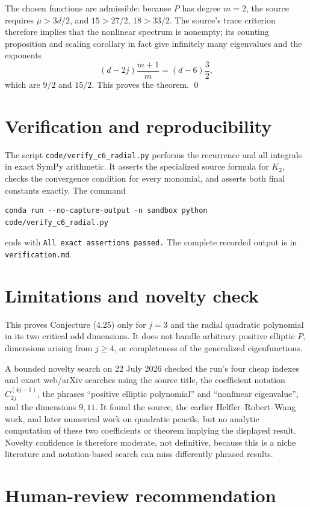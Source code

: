 \documentclass[11pt]{article}
\begin{document}
The chosen functions are admissible: because $P$ has degree $m=2$, the source
requires $\mu>3d/2$, and $15>27/2$, $18>33/2$.  The source's trace criterion
therefore implies that the nonlinear spectrum is nonempty; its counting
proposition and scaling corollary in fact give infinitely many eigenvalues and
the exponents
\[
 (d-2j)\frac{m+1}{m}
  =(d-6)\frac32,
\]
which are $9/2$ and $15/2$.  This proves the theorem. \qed

\section{Verification and reproducibility}

The script \texttt{code/verify\_c6\_radial.py} performs the recurrence and all
integrals in exact SymPy arithmetic.  It asserts the specialized source
formula for $K_2$, checks the convergence condition for every monomial, and
asserts both final constants exactly.  The command
\begin{verbatim}
conda run --no-capture-output -n sandbox python code/verify_c6_radial.py
\end{verbatim}
ends with \texttt{All exact assertions passed.}  The complete recorded output
is in \texttt{verification.md}.

\section{Limitations and novelty check}

This proves Conjecture (4.25) only for $j=3$ and the radial quadratic
polynomial in its two critical odd dimensions.  It does not handle arbitrary
positive elliptic $P$, dimensions arising from $j\geq4$, or completeness of
the generalized eigenfunctions.

A bounded novelty search on 22 July 2026 checked the run's four cheap indexes
and exact web/arXiv searches using the source title, the coefficient notation
$C_{2j}^{(4j-1)}$, the phrases ``positive elliptic polynomial'' and
``nonlinear eigenvalue'', and the dimensions $9,11$.  It found the source,
the earlier Helffer--Robert--Wang work, and later numerical work on quadratic
pencils, but no analytic computation of these two coefficients or theorem
implying the displayed result.  Novelty confidence is therefore moderate,
not definitive, because this is a niche literature and notation-based search
can miss differently phrased results.

\section{Human-review recommendation}
\end{document}
